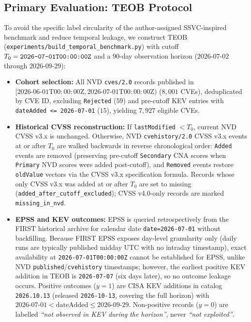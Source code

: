 \documentclass[conference]{IEEEtran}
\begin{document}
\subsection{Primary Evaluation: TEOB Protocol}
\label{sec:teob_method}
To avoid the specific label circularity of the author-assigned SSVC-inspired benchmark and reduce temporal leakage, we construct TEOB (\texttt{experiments/build\_temporal\_benchmark.py}) with cutoff $T_0 = \text{\texttt{2026-07-01T00:00:00Z}}$ and a 90-day observation horizon ($2026\text{-}07\text{-}02$ through $2026\text{-}09\text{-}29$):
\begin{itemize}
    \item \textbf{Cohort selection:} All NVD \texttt{cves/2.0} records published in $[2026\text{-}06\text{-}01\text{T}00:00:00\text{Z}, 2026\text{-}07\text{-}01\text{T}00:00:00\text{Z})$ ($8,001$ CVEs), deduplicated by CVE ID, excluding \texttt{Rejected} ($59$) and pre-cutoff KEV entries with \texttt{dateAdded <= 2026-07-01} ($15$), yielding $7,927$ eligible CVEs.
    \item \textbf{Historical CVSS reconstruction:} If \texttt{lastModified} $< T_0$, current NVD CVSS v3.x is unchanged. Otherwise, NVD \texttt{cvehistory/2.0} CVSS v3.x events at or after $T_0$ are walked backwards in reverse chronological order: \texttt{Added} events are removed (preserving pre-cutoff \texttt{Secondary} CNA scores when \texttt{Primary} NVD scores were added post-cutoff), and \texttt{Removed} events restore \texttt{oldValue} vectors via the CVSS v3.x specification formula. Records whose only CVSS v3.x was added at or after $T_0$ are set to missing (\texttt{added\_after\_cutoff\_excluded}); CVSS v4.0-only records are marked \texttt{missing\_in\_nvd}.
    \item \textbf{EPSS and KEV outcomes:} EPSS is queried retrospectively from the FIRST historical archive for calendar date \texttt{date=2026-07-01} without backfilling. Because FIRST EPSS exposes day-level granularity only (daily runs are typically published midday UTC with no intraday timestamp), exact availability at \texttt{2026-07-01T00:00:00Z} cannot be established for EPSS, unlike NVD \texttt{published}/\texttt{cvehistory} timestamps; however, the earliest positive KEV addition in TEOB is \texttt{2026-07-07} (six days later), so no outcome leakage occurs. Positive outcomes ($y=1$) are CISA KEV additions in catalog \texttt{2026.10.13} (released \texttt{2026-10-13}, covering the full horizon) with $2026\text{-}07\text{-}01 < \text{dateAdded} \le 2026\text{-}09\text{-}29$. Non-positive records ($y=0$) are labelled \emph{``not observed in KEV during the horizon''}, never \emph{``not exploited''}.

\end{itemize}
\end{document}
